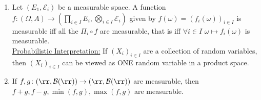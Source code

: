 \documentclass[../main.tex]{subfiles}
\begin{document}
\begin{proposition}
  \hfill
    \begin{enumerate}
       \item Let $(E_1, \mathcal{E}_i)$ be a measurable space. A function $f\colon (\Omega, A) \to
        (\prod_{i \in I} E_i, \bigotimes_{i \in I} \mathcal{E}_i)$ given by $f(\omega) =
        (f_i(\omega))_{i \in I}$ is measurable iff all the $\Pi_i \circ f$ are measurable, that is
        iff $\forall i \in I$ $\omega \mapsto f_i(\omega)$ is measurable.
        \\
        \underline{\sffamily Probabilistic Interpretation:} If $(X_i)_{i \in I}$ are a
        collection of random variables, then $(X_i)_{i \in I}$ can be viewed as ONE random
        variable in a product space.

      \item If $f, g \colon (\rr, \mathcal{B}(\rr)) \to (\rr, \mathcal{B}(\rr))$ are
        measurable, then $f+g, f-g, \min(f, g),\max(f, g)$ are measurable.
    \end{enumerate}
\end{proposition}
\end{document}
